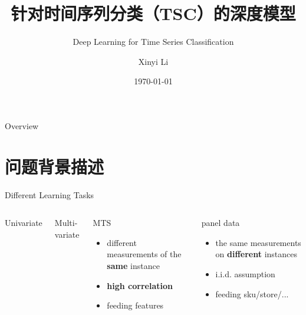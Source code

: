 \documentclass{ctexbeamer}
\title{针对时间序列分类（TSC）的深度模型}
\subtitle{Deep Learning for Time Series Classification \footfullcite{fawaz2019deep}}
\author{Xinyi Li}
\date{\today}
\begin{document}
\begin{frame}
	\titlepage
\end{frame}

\begin{frame}{Overview}
  \tableofcontents
\end{frame}

\section{问题背景描述}
\begin{frame}{Different Learning Tasks}
	\begin{columns}

		Univariate

		Multi-variate
		\begin{block}{MTS}
			\begin{itemize}
				\item different measurements of the \textbf{same} instance
				\item \textbf{high correlation}
				\item feeding features
			\end{itemize}
		\end{block}

		\begin{block}{panel data}
			\begin{itemize}
				\item the same measurements on \textbf{different} instances
				\item i.i.d. assumption
				\item feeding sku/store/...
			\end{itemize}
		\end{block}
	\end{columns}
\end{frame}
\end{document}
